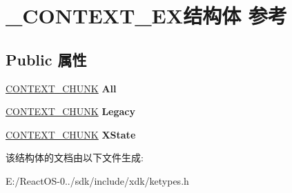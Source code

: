 \hypertarget{struct___c_o_n_t_e_x_t___e_x}{}\section{\+\_\+\+C\+O\+N\+T\+E\+X\+T\+\_\+\+E\+X结构体 参考}
\label{struct___c_o_n_t_e_x_t___e_x}
\subsection*{Public 属性}
\begin{DoxyCompactItemize}
\item 
\mbox{\label{struct___c_o_n_t_e_x_t___e_x_ab04f38c48d6d6c064301ffeca385f04b}} 
\hyperlink{struct___c_o_n_t_e_x_t___c_h_u_n_k}{C\+O\+N\+T\+E\+X\+T\+\_\+\+C\+H\+U\+NK} {\bfseries All}
\item 
\mbox{\label{struct___c_o_n_t_e_x_t___e_x_ae43e0a514c66335786eae3cf490bd1ff}} 
\hyperlink{struct___c_o_n_t_e_x_t___c_h_u_n_k}{C\+O\+N\+T\+E\+X\+T\+\_\+\+C\+H\+U\+NK} {\bfseries Legacy}
\item 
\mbox{\label{struct___c_o_n_t_e_x_t___e_x_aa8bd1f391ac6338b1c0a0c8527388a14}} 
\hyperlink{struct___c_o_n_t_e_x_t___c_h_u_n_k}{C\+O\+N\+T\+E\+X\+T\+\_\+\+C\+H\+U\+NK} {\bfseries X\+State}
\end{DoxyCompactItemize}


该结构体的文档由以下文件生成\+:\begin{DoxyCompactItemize}
\item 
E\+:/\+React\+O\+S-\/0../sdk/include/xdk/ketypes.\+h\end{DoxyCompactItemize}
